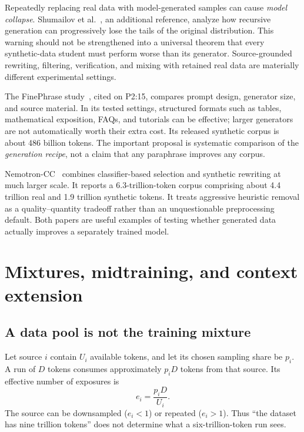 Repeatedly replacing real data with model-generated samples can cause \emph{model collapse}. Shumailov et al.~\cite{collapse}, an additional reference, analyze how recursive generation can progressively lose the tails of the original distribution. This warning should not be strengthened into a universal theorem that every synthetic-data student must perform worse than its generator. Source-grounded rewriting, filtering, verification, and mixing with retained real data are materially different experimental settings.

The FinePhrase study~\cite{finephrase}, cited on P2:15, compares prompt design, generator size, and source material. In its tested settings, structured formats such as tables, mathematical exposition, FAQs, and tutorials can be effective; larger generators are not automatically worth their extra cost. Its released synthetic corpus is about 486 billion tokens. The important proposal is systematic comparison of the \emph{generation recipe}, not a claim that any paraphrase improves any corpus.

Nemotron-CC~\cite{nemotron} combines classifier-based selection and synthetic rewriting at much larger scale. It reports a 6.3-trillion-token corpus comprising about 4.4 trillion real and 1.9 trillion synthetic tokens. It treats aggressive heuristic removal as a quality--quantity tradeoff rather than an unquestionable preprocessing default. Both papers are useful examples of testing whether generated data actually improves a separately trained model.

\section{Mixtures, midtraining, and context extension}
\subsection{A data pool is not the training mixture}
Let source $i$ contain $U_i$ available tokens, and let its chosen sampling share be $p_i$. A run of $D$ tokens consumes approximately $p_iD$ tokens from that source. Its effective number of exposures is
\[
e_i=\frac{p_iD}{U_i}.
\]
The source can be downsampled ($e_i<1$) or repeated ($e_i>1$). Thus ``the dataset has nine trillion tokens'' does not determine what a six-trillion-token run sees.



